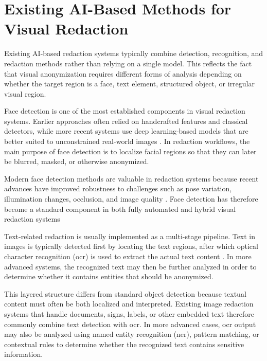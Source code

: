 
\section{Existing AI-Based Methods for Visual Redaction}

Existing AI-based redaction systems typically combine detection, recognition, and redaction methods rather than relying on a single model. This reflects the fact that visual \gls{anonymization} requires different forms of analysis depending on whether the target region is a face, text element, structured object, or irregular visual region.


Face detection is one of the most established components in visual redaction systems. Earlier approaches often relied on handcrafted features and classical detectors, while more recent systems use deep learning-based models that are better suited to unconstrained real-world images \cite{zhao2018review,
deng2020retinaface}. In redaction workflows, the main purpose of face detection is to localize facial regions so that they can later be blurred, masked, or otherwise anonymized.

Modern face detection methods are valuable in redaction systems because recent advances have improved robustness to challenges such as pose variation, illumination changes, occlusion, and image quality \cite{zhang2010survey, hasan2021face}. Face detection has therefore become a standard component in both fully automated and hybrid visual redaction systems


Text-related redaction is usually implemented as a multi-stage pipeline. Text in images is typically detected first by locating the text regions, after which optical character recognition (\acrshort{ocr}) is used to extract the actual text content \cite{zhou2017east, du2020ppocr}. In more advanced systems, the recognized text may then be further analyzed in order to determine whether it contains entities that should be anonymized.

This layered structure differs from standard \gls{object detection} because textual content must often be both localized and interpreted. Existing image redaction systems that handle documents, signs, labels, or other embedded text therefore
commonly combine text detection with \acrshort{ocr}. In more advanced cases, \acrshort{ocr} output may also be analyzed using named entity recognition (\acrshort{ner}), pattern matching, or contextual rules to determine whether the recognized text contains sensitive information.

